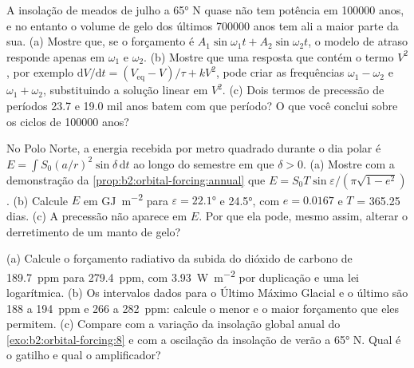 \begin{exercise}[$\star\star\star$]\label{exo:b2:orbital-forcing:10}
A insolação de meados de julho a \ang{65} N quase não tem potência em \num{100000} anos, e no entanto o volume de gelo
dos últimos \num{700000} anos tem ali a maior parte da sua. (a) Mostre que, se o forçamento é $A_1\sin
\omega_1 t + A_2\sin\omega_2 t$, o modelo de atraso responde apenas em $\omega_1$ e $\omega_2$. (b) Mostre
que uma resposta que contém o termo $V^2$, por exemplo $\mathrm dV/\mathrm dt = (V_{\mathrm{eq}} -
V)/\tau + kV^2$, pode criar as frequências $\omega_1 - \omega_2$ e $\omega_1 + \omega_2$,
substituindo a solução linear em $V^2$. (c) Dois termos de precessão de períodos \num{23.7} e
\num{19.0} mil anos batem com que período? O que você conclui sobre os ciclos de
\num{100000} anos?
\end{exercise}

\begin{exercise}[$\star\star\star$]\label{exo:b2:orbital-forcing:11}
No Polo Norte, a energia recebida por metro quadrado durante o dia polar é $E = \int S_0(a/r)^2
\sin\delta\,\mathrm dt$ ao longo do semestre em que $\delta > 0$. (a) Mostre com a demonstração da
\cref{prop:b2:orbital-forcing:annual} que $E = S_0T\sin\varepsilon/(\pi\sqrt{1 - e^2})$. (b) Calcule
$E$ em \unit{GJ.m^{-2}} para $\varepsilon = \ang{22.1}$ e \ang{24.5}, com $e = 0.0167$ e $T$ =
365.25 dias. (c) A precessão não aparece em $E$. Por que ela pode, mesmo assim, alterar o
derretimento de um manto de gelo?
\end{exercise}

\begin{exercise}[$\star\star\star$]\label{exo:b2:orbital-forcing:12}
(a) Calcule o forçamento radiativo da subida do dióxido de carbono de \qty{189.7}{ppm} para
\qty{279.4}{ppm}, com \qty{3.93}{W.m^{-2}} por duplicação e uma lei logarítmica. (b) Os intervalos
dados para o Último Máximo Glacial e o último  são 188 a \qty{194}{ppm} e 266 a
\qty{282}{ppm}: calcule o menor e o maior forçamento que eles permitem. (c) Compare com a variação
da insolação global anual do \cref{exo:b2:orbital-forcing:8} e com a oscilação da insolação de verão a
\ang{65} N. Qual é o gatilho e qual o amplificador?
\end{exercise}


